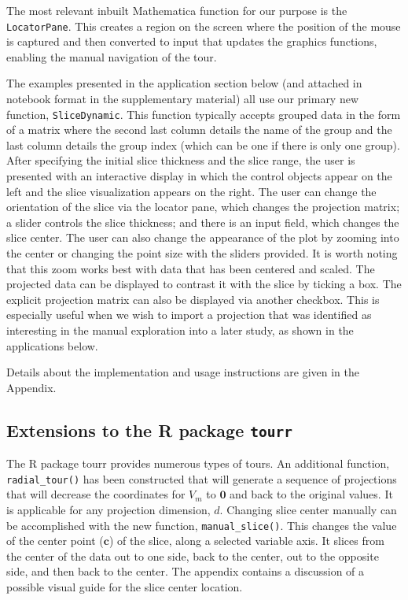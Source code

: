 \documentclass[]{interact}
\theoremstyle{plain}%
\theoremstyle{definition}
\theoremstyle{remark}
\begin{document}
The most relevant inbuilt Mathematica function for our purpose is the
\texttt{LocatorPane}. This creates a region on the screen where the
position of the mouse is captured and then converted to input that
updates the graphics functions, enabling the manual navigation of the
tour.

The examples presented in the application section below (and attached in
notebook format in the supplementary material) all use our primary new
function, \texttt{SliceDynamic}. This function typically accepts grouped
data in the form of a matrix where the second last column details the
name of the group and the last column details the group index (which can
be one if there is only one group). After specifying the initial slice
thickness and the slice range, the user is presented with an interactive
display in which the control objects appear on the left and the slice
visualization appears on the right. The user can change the orientation
of the slice via the locator pane, which changes the projection matrix;
a slider controls the slice thickness; and there is an input field,
which changes the slice center. The user can also change the appearance
of the plot by zooming into the center or changing the point size with
the sliders provided. It is worth noting that this zoom works best with
data that has been centered and scaled. The projected data can be
displayed to contrast it with the slice by ticking a box. The explicit
projection matrix can also be displayed via another checkbox. This is
especially useful when we wish to import a projection that was
identified as interesting in the manual exploration into a later study,
as shown in the applications below.

Details about the implementation and usage instructions are given in the
Appendix.

\hypertarget{extensions-to-the-r-package-tourr}{%
\subsection{\texorpdfstring{Extensions to the R package
\texttt{tourr}}{Extensions to the R package tourr}}\label{extensions-to-the-r-package-tourr}}

The R package tourr \citep{tourr} provides numerous types of tours. An
additional function, \texttt{radial\_tour()} has been constructed that
will generate a sequence of projections that will decrease the
coordinates for \(V_m\) to \(\boldsymbol{0}\) and back to the original
values. It is applicable for any projection dimension, \(d\). Changing
slice center manually can be accomplished with the new function,
\texttt{manual\_slice()}. This changes the value of the center point
(\(\mathbf{c}\)) of the slice, along a selected variable axis. It slices
from the center of the data out to one side, back to the center, out to
the opposite side, and then back to the center. The appendix contains a
discussion of a possible visual guide for the slice center location.
\end{document}
